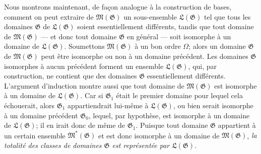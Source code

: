 Nous montrons maintenant, de façon analogue à la construction de bases, comment on peut extraire de $\mathfrak M(\mathfrak G)$ un sous-ensemble $\mathfrak L(\mathfrak G)$ tel que tous les domaines $\mathfrak G$ de $\mathfrak L(\mathfrak G)$ soient essentiellement différents, tandis que tout domaine de $\mathfrak M(\mathfrak G)$ --- et donc tout domaine $\mathfrak G$ en général --- soit isomorphe à un domaine de $\mathfrak L(\mathfrak G)$. Soumettons $\mathfrak M(\mathfrak G)$ à un bon ordre $\Omega$; alors un domaine $\mathfrak G$ de $\mathfrak M(\mathfrak G)$ peut être isomorphe ou non à un domaine précédent. Les domaines $\mathfrak G$ isomorphes à aucun précédent forment un ensemble $\mathfrak L(\mathfrak G)$, qui, par construction, ne contient que des domaines $\mathfrak G$ essentiellement différents. L'argument d'induction montre aussi que tout domaine de $\mathfrak M(\mathfrak G)$ est isomorphe à un domaine de $\mathfrak L(\mathfrak G)$. Car si $\mathfrak G_1$ était le premier domaine pour lequel cela échouerait, alors $\mathfrak G_1$ appartiendrait lui-même à $\mathfrak L(\mathfrak G)$, ou bien serait isomorphe à un domaine précédent $\mathfrak G_0$, lequel, par hypothèse, est isomorphe à un domaine de $\mathfrak L(\mathfrak G)$; il en irait donc de même de $\mathfrak G_1$. Puisque tout domaine $\mathfrak G$ appartient à un certain ensemble $\mathfrak M^*(\mathfrak G)$ et est donc isomorphe à un domaine de $\mathfrak M(\mathfrak G)$, \emph{la totalité des classes de domaines $\mathfrak G$ est représentée par $\mathfrak L(\mathfrak G)$.}

